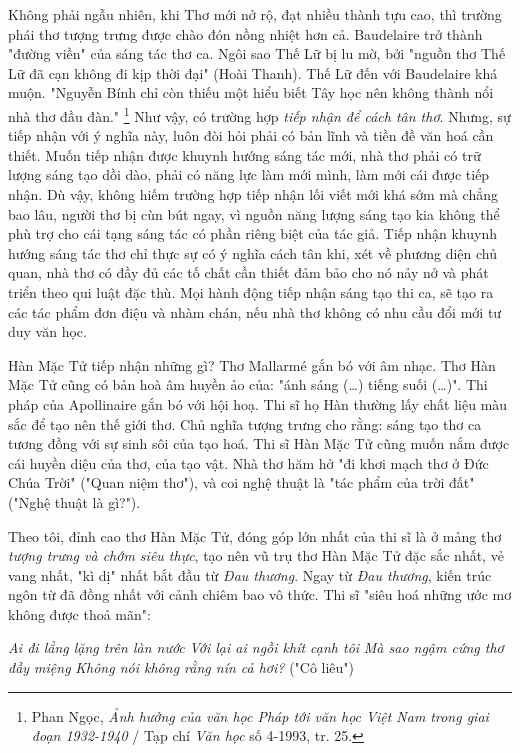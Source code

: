 \documentclass[../main.tex]{subfiles}
\begin{document}
\begin{multicols}{2}
Không phải ngẫu nhiên, khi Thơ mới nở rộ, đạt nhiều thành tựu cao, thì trường phái thơ tượng trưng được chào đón nồng nhiệt hơn cả. Baudelaire trở thành "đường viền" của sáng tác thơ ca. Ngôi sao Thế Lữ bị lu mờ, bởi "nguồn thơ Thế Lữ đã cạn không đi kịp thời đại" (Hoài Thanh). Thế Lữ đến với Baudelaire khá muộn. "Nguyễn Bính chỉ còn thiếu một hiểu biết Tây học nên không thành nổi nhà thơ đầu đàn." \footnote{
Phan Ngọc, \textit{Ảnh hưởng của văn học Pháp tới văn học Việt Nam trong giai đoạn 1932-1940} / Tạp chí \textit{Văn học} số 4-1993, tr. 25.}  Như vậy, có trường hợp \textit{tiếp nhận để cách tân thơ}. Nhưng, sự tiếp nhận với ý nghĩa này, luôn đòi hỏi phải có bản lĩnh và tiền đề văn hoá cần thiết. Muốn tiếp nhận được khuynh hướng sáng tác mới, nhà thơ phải có trữ lượng sáng tạo dồi dào, phải có năng lực làm mới mình, làm mới cái được tiếp nhận. Dù vậy, không hiếm trường hợp tiếp nhận lối viết mới khá sớm mà chẳng bao lâu, người thơ bị cùn bút ngay, vì nguồn năng lượng sáng tạo kia không thể phù trợ cho cái tạng sáng tác có phần riêng biệt của tác giả. Tiếp nhận khuynh hướng sáng tác thơ chỉ thực sự có ý nghĩa cách tân khi, xét về phương diện chủ quan, nhà thơ có đầy đủ các tố chất cần thiết đảm bảo cho nó nảy nở và phát triển theo qui luật đặc thù. Mọi hành động tiếp nhận sáng tạo thi ca, sẽ tạo ra các tác phẩm đơn điệu và nhàm chán, nếu nhà thơ không có nhu cầu đổi mới tư duy văn học. 
 
Hàn Mặc Tử tiếp nhận những gì? Thơ Mallarmé gắn bó với âm nhạc. Thơ Hàn Mặc Tử cũng có bản hoà âm huyền ảo của: "ánh sáng (…) tiếng suối (…)". Thi pháp của Apollinaire gắn bó với hội hoạ. Thi sĩ họ Hàn thường lấy chất liệu màu sắc để tạo nên thế giới thơ. Chủ nghĩa tượng trưng cho rằng: sáng tạo thơ ca tương đồng với sự sinh sôi của tạo hoá. Thi sĩ Hàn Mặc Tử cũng muốn nắm được cái huyền diệu của thơ, của tạo vật. Nhà thơ hăm hở "đi khơi mạch thơ ở Đức Chúa Trời" ("Quan niệm thơ"), và coi nghệ thuật là "tác phẩm của trời đất" ("Nghệ thuật là gì?"). 
 
Theo tôi, đỉnh cao thơ Hàn Mặc Tử, đóng góp lớn nhất của thi sĩ là ở mảng thơ \textit{tượng trưng và chớm siêu thực}, tạo nên vũ trụ thơ Hàn Mặc Tử đặc sắc nhất, vẻ vang nhất, "kì dị" nhất bắt đầu từ \textit{Đau thương}. Ngay từ \textit{Đau thương}, kiến trúc ngôn từ đã đồng nhất với cảnh chiêm bao vô thức. Thi sĩ  "siêu hoá những ước mơ không được thoả mãn": 
 
\textit{Ai đi lẳng lặng trên làn nước} 
\textit{Với lại ai ngồi khít cạnh tôi} 
\textit{Mà sao ngậm cứng thơ đầy miệng} 
\textit{Không nói không rằng nín cả hơi?} 
("Cô liêu") 
 

\end{multicols}
\end{document}
